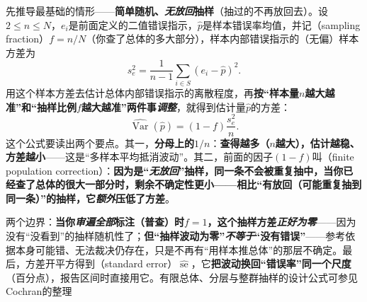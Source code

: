 先推导最基础的情形——\textbf{简单随机、\emph{无放回}抽样}（抽过的不再放回去）。设$2\leq n\leq N$，$e_i$是前面定义的二值错误指示，$\widehat p$是样本错误率均值，并记（sampling fraction）$f=n/N$（你查了总体的多大部分），样本内部错误指示的（无偏）样本方差为
$$s_e^2=\frac{1}{n-1}\sum_{i\in S}(e_i-\widehat p)^2.$$用这个样本方差去估计总体内部错误指示的离散程度，再\textbf{按“样本量$n$越大越准”和“抽样比例$f$越大越准”两件事\emph{调整}}，就得到估计量$\widehat p$的方差：
\begin{equation}
  \widehat{\operatorname{Var}}(\widehat p)
  =
  (1-f)\frac{s_e^2}{n}.
  \label{eq:knowledge-quality-assessment-correction-srs-variance}
\end{equation}
这个公式要读出两个要点。其一，\textbf{分母上的$1/n$}：\textbf{查得越多（$n$越大），估计越稳、方差越小}——这是“多样本平均抵消波动”。其二，前面的因子$(1-f)$叫（finite population correction）：\textbf{因为是“\emph{无放回}”抽样，\textbf{同一条不会被重复抽中}，当你\textbf{已经查了总体的很大一部分}时，剩余不确定性更小——\textbf{相比“有放回（可能重复抽到同一条）”的抽样，它\emph{额外}压低了方差}}。

两个边界：\textbf{当你\emph{审遍全部}标注（普查）时$f=1$，这个抽样方差\emph{正好为零}}——因为没有“没看到”的抽样随机性了；\textbf{但“抽样波动为零”\emph{不等于}“没有错误”}——参考依据本身可能错、无法裁决仍存在，只是不再有“用样本推总体”的那层不确定。最后，方差开平方得到（standard error）$\widehat{\operatorname{se}}$，它\textbf{把波动换回“错误率”同一个尺度}（百分点），报告区间时直接用它。有限总体、分层与整群抽样的设计公式可参见Cochran的整理


